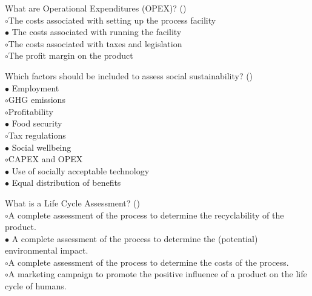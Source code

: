 \documentclass[]{beamer}
\begin{document}
\begin{CJK}{UTF8}{gbsn}
\begin{frame}[shrink] {} 
\addtocounter{questions}{1}
\color{blue}
  What are Operational Expenditures (OPEX)?
 ({})\\
\color{black}
\setlength{\parindent}{-0.4cm}
{\color{red}$\circ$}The costs associated with setting up the process facility  \\
{\color{red}$\bullet$} The costs associated with running the facility  \\
{\color{red}$\circ$}The costs associated with taxes and legislation  \\
{\color{red}$\circ$}The profit margin on the product  \\
\end{frame}


\begin{frame}[shrink] {} 
\addtocounter{questions}{1}
\color{blue}
  Which factors should be included to assess social sustainability? 
 ({})\\
\color{black}
\setlength{\parindent}{-0.4cm}
{\color{red}$\bullet$} Employment  \\
{\color{red}$\circ$}GHG emissions  \\
{\color{red}$\circ$}Profitability  \\
{\color{red}$\bullet$} Food security  \\
{\color{red}$\circ$}Tax regulations  \\
{\color{red}$\bullet$} Social wellbeing  \\
{\color{red}$\circ$}CAPEX and OPEX  \\
{\color{red}$\bullet$} Use of socially acceptable technology  \\
{\color{red}$\bullet$} Equal distribution of benefits  \\
\end{frame}


\begin{frame}[shrink] {} 
\addtocounter{questions}{1}
\color{blue}
  What is a Life Cycle Assessment?
 ({})\\
\color{black}
\setlength{\parindent}{-0.4cm}
{\color{red}$\circ$}A complete assessment of the process to determine the recyclability of the product.  \\
{\color{red}$\bullet$} A complete assessment of the process to determine the (potential) environmental impact.  \\
{\color{red}$\circ$}A complete assessment of the process to determine the costs of the process.  \\
{\color{red}$\circ$}A marketing campaign to promote the positive influence of a product on the life cycle of humans.  \\


\end{frame}
\end{CJK}
\end{document}
